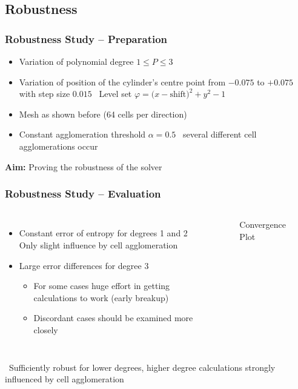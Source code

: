 	\subsection{Robustness}
	\begin{frame}
		\frametitle{Robustness Study -- Preparation}
		\begin{itemize}
			\item Variation of polynomial degree $ 1 \leq P \leq 3$
			\item Variation of position of the cylinder's centre point from $-0.075$ to $+0.075$ with step size $0.015$ \newline \MVRightArrow \, Level set $\varphi  = (x-\text{shift)}^2 + y^2 -1$
			\item Mesh as shown before (64 cells per direction)
			\item Constant agglomeration threshold $\alpha = 0.5$  \newline \MVRightArrow \, several different cell agglomerations occur			
		\end{itemize}
		\vspace{0.5cm}
		\begin{center}
			\large
			\textbf{Aim:} Proving the robustness of the solver
		\end{center}
	\end{frame}
	\begin{frame}
		\frametitle{Robustness Study -- Evaluation}
		\begin{columns}[t]
	\column[]{6cm}
		\vspace{-0.5cm}
	\begin{itemize}
		\item Constant error of entropy for degrees 1 and 2 \newline \MVRightarrow \, Only slight influence by cell agglomeration
		\item Large error differences for degree 3
		\begin{itemize}
			\item For some cases huge effort in getting calculations to work (early breakup)
			\item Discordant cases should be examined more closely
		\end{itemize}
	\end{itemize}
	\column[]{6cm}
			\begin{figure}[htp]	
				\vspace{-1cm}
				\centering
				
				\caption{Convergence Plot}
				\label{shifterror}
			\end{figure}
		\end{columns}
	\begin{center}
		\large
		\MVRightarrow \, Sufficiently robust for lower degrees, higher degree calculations strongly influenced by cell agglomeration
	\end{center}
	\end{frame}
